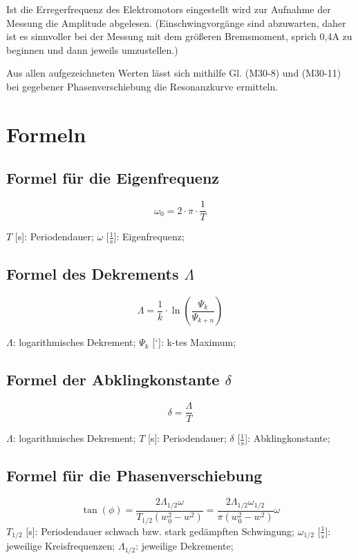 \documentclass[fontsize=12pt]{scrartcl}
\begin{document}
Ist die Erregerfrequenz des Elektromotors eingestellt wird zur Aufnahme der Messung die Amplitude abgelesen. (Einschwingvorgänge sind abzuwarten, daher ist es sinnvoller bei der Messung mit dem größeren Bremsmoment, sprich 0,4A zu beginnen und dann jeweils umzustellen.) \par

Aus allen aufgezeichneten Werten lässt sich mithilfe Gl. (M30-8) und (M30-11) bei gegebener Phasenverschiebung die Resonanzkurve ermitteln.
\newpage
\section{Formeln}

\subsection{Formel für die Eigenfrequenz}

\begin{equation}
\omega_0=2\cdot \pi \cdot \frac{1}{T}
\label{T}
\end{equation}

$T$ [s]: Periodendauer;
$\omega$ [$\frac{1}{\text{s}}$]: Eigenfrequenz;

\subsection{Formel des Dekrements $\Lambda$}

\begin{equation}
\Lambda = \frac{1}{k} \cdot \ln(\frac{\Psi_k}{\Psi_{k+n}})
\label{Lambda}
\end{equation}

$\Lambda$: logarithmisches Dekrement;
$\Psi_k$ [$^{\circ}$]: k-tes Maximum;

\subsection{Formel der Abklingkonstante $\delta$}

\begin{equation}
\delta  = \frac{\Lambda}{T}
\label{delta}
\end{equation}

$\Lambda$: logarithmisches Dekrement;
$T$ [s]: Periodendauer;
$\delta$ [$\frac{1}{\text{s}}$]: Abklingkonstante;

\subsection{Formel für die Phasenverschiebung}
\begin{equation}
\tan(\phi)=  \frac{2\Lambda_{1/2}\omega}{T_{1/2}(w_0^2-w^2)}=\frac{2\Lambda_{1/2}\omega_{1/2}}{\pi(w_0^2-w^2)}\omega
\label{tan}
\end{equation}
$T_{1/2}$ [s]: Periodendauer schwach bzw. stark gedämpften Schwingung;
$\omega_{1/2}$ [$\frac{1}{\text{s}}$]: jeweilige Kreisfrequenzen;
$\Lambda_{1/2}$: jeweilige Dekremente;
\end{document}
